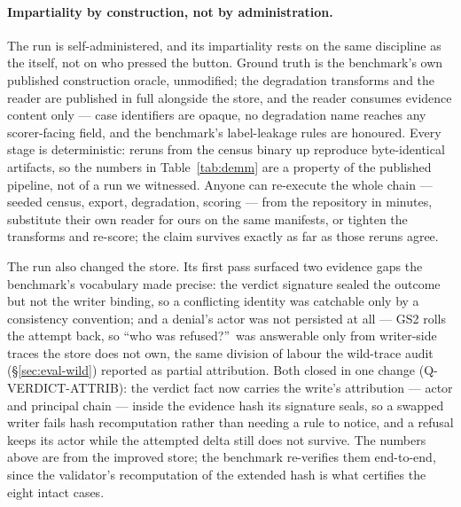 \paragraph{Impartiality by construction, not by administration.}
The run is self-administered, and its impartiality rests on the same
discipline as the \census itself, not on who pressed the button.
Ground truth is the benchmark's own published construction oracle,
unmodified; the degradation transforms and the reader are published
in full alongside the store, and the reader consumes evidence content
only --- case identifiers are opaque, no degradation name reaches any
scorer-facing field, and the benchmark's label-leakage rules are
honoured. Every stage is deterministic: reruns from the census binary
up reproduce byte-identical artifacts, so the numbers in
Table~\ref{tab:demm} are a property of the published pipeline, not of
a run we witnessed. Anyone can re-execute the whole chain --- seeded
census, export, degradation, scoring --- from the repository in
minutes, substitute their own reader for ours on the same manifests,
or tighten the transforms and re-score; the claim survives exactly as
far as those reruns agree.

The run also changed the store. Its first pass surfaced two evidence
gaps the benchmark's vocabulary made precise: the verdict signature
sealed the outcome but not the writer binding, so a conflicting
identity was catchable only by a consistency convention; and a
denial's actor was not persisted at all --- GS2 rolls the attempt back,
so ``who was refused?''\ was answerable only from writer-side traces
the store does not own, the same division of labour the wild-trace
audit (\S\ref{sec:eval-wild}) reported as partial attribution. Both
closed in one change (Q-VERDICT-ATTRIB): the verdict fact now carries
the write's attribution --- actor and principal chain --- inside the
evidence hash its signature seals, so a swapped writer fails hash
recomputation rather than needing a rule to notice, and a refusal
keeps its actor while the attempted delta still does not survive.
The numbers above are from the improved store; the benchmark
re-verifies them end-to-end, since the validator's recomputation of
the extended hash is what certifies the eight intact cases.
